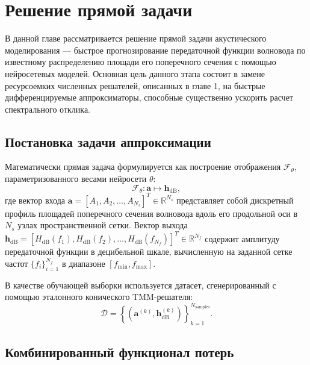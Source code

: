 \chapter{Решение прямой задачи}
\label{ch:direct_problem}

В данной главе рассматривается решение прямой задачи акустического моделирования — быстрое прогнозирование передаточной функции волновода по известному распределению площади его поперечного сечения с помощью нейросетевых моделей. Основная цель данного этапа состоит в замене ресурсоемких численных решателей, описанных в главе 1, на быстрые дифференцируемые аппроксиматоры, способные существенно ускорить расчет спектрального отклика.

\section{Постановка задачи аппроксимации}
\label{sec:approximation_statement}

Математически прямая задача формулируется как построение отображения $\mathcal{F}_{\theta}$, параметризованного весами нейросети $\theta$:
\begin{equation}
    \mathcal{F}_{\theta} : \mathbf{a} \longmapsto \mathbf{h}_{\mathrm{dB}},
\end{equation}
где вектор входа $\mathbf{a} = [A_1, A_2, \dots, A_{N_s}]^T \in \mathbb{R}^{N_s}$ представляет собой дискретный профиль площадей поперечного сечения волновода вдоль его продольной оси в $N_s$ узлах пространственной сетки. Вектор выхода $\mathbf{h}_{\mathrm{dB}} = [H_{\mathrm{dB}}(f_1), H_{\mathrm{dB}}(f_2), \dots, H_{\mathrm{dB}}(f_{N_f})]^T \in \mathbb{R}^{N_f}$ содержит амплитуду передаточной функции в децибельной шкале, вычисленную на заданной сетке частот $\{f_i\}_{i=1}^{N_f}$ в диапазоне $[f_{\min}, f_{\max}]$.

В качестве обучающей выборки используется датасет, сгенерированный с помощью эталонного конического TMM-решателя:
\begin{equation}
    \mathcal{D} = \left\{ \left( \mathbf{a}^{(k)}, \mathbf{h}_{\mathrm{dB}}^{(k)} \right) \right\}_{k=1}^{N_{\mathrm{samples}}}.
\end{equation}

\section{Комбинированный функционал потерь}
\label{sec:loss_function}

